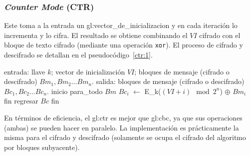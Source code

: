 %
%

\subsubsection{\textit{Counter Mode} (CTR)}
\label{sec:ctr}

Este toma a la entrada un \gls{gl:vector_de_inicializacion} y en cada iteración
lo incrementa y lo cifra. El resultado se obtiene combinando el $ VI $ cifrado
con el bloque de texto cifrado (mediante una operación \verb|xor|). El proceso
de cifrado y descifrado se detallan en el pseudocódigo~\ref{ctr:1}.

\begin{pseudocodigo}[%
    caption={\Gls{gl:modo_de_operacion} \gls{gl:ctr}%
      (cifrado y descifrado).},
    label={ctr:1}%
  ]
    entrada: llave $ k $; vector de inicialización $ VI $;
             bloques de mensaje (cifrado o descifrado) $ Bm_1, Bm_2 \dots Bm_n $.
    salida:  bloques de mensaje (cifrado o descifrado) $ Bc_1, Bc_2 \dots Bc_n $.
    inicio
      para_todo $Bm$
        $Bc_i$ $\gets$ E_k($ (VI + i) \mod 2^n $) $\oplus$ $Bm_i$
      fin
      regresar $Bc$
    fin
\end{pseudocodigo}

En términos de eficiencia, el \gls{gl:ctr} es mejor que \gls{gl:cbc}, ya que
sus operaciones (ambas) se pueden hacer en paralelo. La implementación es
prácticamente la misma para el cifrado y descifrado (solamente se ocupa el
cifrado del algoritmo por bloques subyacente).
